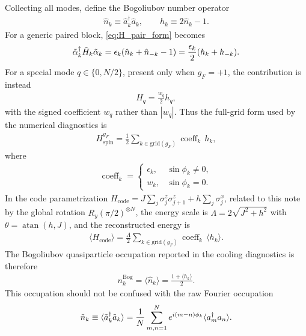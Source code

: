 \documentclass[aps,prx,twocolumn,superscriptaddress,nofootinbib,nolongbibliography,nobalancelastpage,10pt,floatfix]{revtex4-2}
\begin{document}
Collecting all modes, define the Bogoliubov number operator
\begin{align}
    \hat n_k \equiv \hat a_k^\dag \hat a_k,\qquad
    h_k \equiv 2\hat n_k-1.
    \label{eq:hk_individual_def}
\end{align}
For a generic paired block, \cref{eq:H_pair_form} becomes
\begin{align}
    \tilde{\alpha}_k^\dag \tilde{H}_k \tilde{\alpha}_k
    = \epsilon_k(\hat n_k+\hat n_{-k}-1)
    = \frac{\epsilon_k}{2}(h_k+h_{-k}).
\end{align}
For a special mode $q\in\{0,N/2\}$, present only when $g_F=+1$, the contribution is instead
\begin{align}
    H_q=\frac{w_q}{2}h_q,
\end{align}
with the signed coefficient $w_q$ rather than $|w_q|$.
Thus the full-grid form used by the numerical diagnostics is
\begin{align}
    H_{\mathrm{spin}}^{g_F}
    = \frac{1}{2}\sum_{k\in\mathrm{grid}(g_F)} \operatorname{coeff}_k\,h_k,
    \label{eq:H_full_grid_hk}
\end{align}
where
\begin{align}
    \operatorname{coeff}_k =
    \begin{cases}
        \epsilon_k, & \sin\phi_k\neq 0,\\
        w_k,        & \sin\phi_k=0.
    \end{cases}
\end{align}
In the code parametrization
$H_{\mathrm{code}}=J\sum_j\sigma^z_j\sigma^z_{j+1}+h\sum_j\sigma^x_j$,
related to this note by the global rotation $R_y(\pi/2)^{\otimes N}$, the energy scale is
$\Lambda=2\sqrt{J^2+h^2}$ with $\theta=\operatorname{atan}(h,J)$, and the reconstructed energy is
\begin{align}
    \langle H_{\mathrm{code}}\rangle
    = \frac{\Lambda}{2}\sum_{k\in\mathrm{grid}(g_F)}
      \operatorname{coeff}_k\,\langle h_k\rangle.
    \label{eq:code_energy_from_hk}
\end{align}
The Bogoliubov quasiparticle occupation reported in the cooling diagnostics is therefore
\begin{align}
    n_k^{\mathrm{Bog}} = \langle \hat n_k\rangle
    = \frac{1+\langle h_k\rangle}{2}.
    \label{eq:bog_occupation_from_hk}
\end{align}
This occupation should not be confused with the raw Fourier occupation
\begin{align}
    \tilde n_k
    \equiv \langle \tilde{a}_k^\dag\tilde{a}_k\rangle
    = \frac{1}{N}\sum_{m,n=1}^{N}e^{i(m-n)\phi_k}
      \langle a_m^\dag a_n\rangle .
    \label{eq:raw_fourier_occupation}
\end{align}
\end{document}
